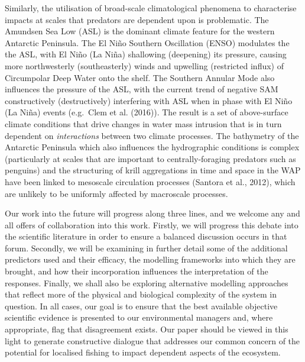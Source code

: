 \documentclass[]{elsarticle} %
\begin{document}
Similarly, the utilisation of broad-scale climatological phenomena to
characterise impacts at scales that predators are dependent upon is
problematic. The Amundsen Sea Low (ASL) is the dominant climate feature
for the western Antarctic Peninsula. The El Niño Southern Oscillation
(ENSO) modulates the the ASL, with El Niño (La Niña) shallowing
(deepening) its pressure, causing more northwesterly (southeasterly)
winds and upwelling (restricted influx) of Circumpolar Deep Water onto
the shelf. The Southern Annular Mode also influences the pressure of the
ASL, with the current trend of negative SAM constructively
(destructively) interfering with ASL when in phase with El Niño (La
Niña) events (e.g.~Clem et al. (2016)). The result is a set of
above-surface climate conditions that drive changes in water mass
intrusion that is in turn dependent on \emph{interactions} between two
climate processes. The bathymetry of the Antarctic Peninsula which also
influences the hydrographic conditions is complex (particularly at
scales that are important to centrally-foraging predators such as
penguins) and the structuring of krill aggregations in time and space in
the WAP have been linked to mesoscale circulation processes (Santora et
al., 2012), which are unlikely to be uniformly affected by macroscale
processes.

Our work into the future will progress along three lines, and we welcome
any and all offers of collaboration into this work. Firstly, we will
progress this debate into the scientific literature in order to ensure a
balanced discussion occurs in that forum. Secondly, we will be examining
in further detail some of the additional predictors used and their
efficacy, the modelling frameworks into which they are brought, and how
their incorporation influences the interpretation of the responses.
Finally, we shall also be exploring alternative modelling approaches
that reflect more of the physical and biological complexity of the
system in question. In all cases, our goal is to ensure that the best
available objective scientific evidence is presented to our
environmental managers and, where appropriate, flag that disagreement
exists. Our paper should be viewed in this light to generate
constructive dialogue that addresses our common concern of the potential
for localised fishing to impact dependent aspects of the ecosystem.
\newpage  
\end{document}
